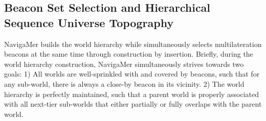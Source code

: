 \documentclass[unnumsec,webpdf,contemporary,large]{oup-authoring-template}%
\theoremstyle{thmstyleone}%
\theoremstyle{thmstyletwo}%
\theoremstyle{thmstylethree}%
\begin{document}


\subsection{Beacon Set Selection and Hierarchical Sequence Universe Topography}

NavigaMer builds the world hierarchy while simultaneously selects multilateration beacons at the same time through construction by insertion.
Briefly, during the world hierarchy construction, NavigaMer simultaneously strives towards two goals:
1) All worlds are well-sprinkled with and covered by beacons, such that for any sub-world, there is always a close-by beacon in its vicinity.
2) The world hierarchy is perfectly maintained, such that a parent world is properly associated with all next-tier sub-worlds that either partially or fully overlaps with the parent world.
\end{document}
